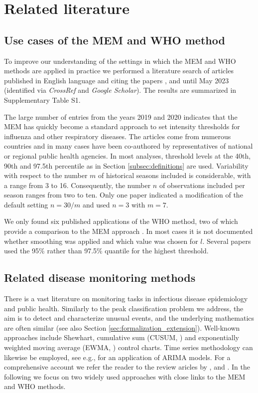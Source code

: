 \documentclass[12pt]{article}
\begin{document}
\section{Related literature}
\label{sec:review}

\subsection{Use cases of the MEM and WHO method}


To improve our understanding of the settings in which the MEM and WHO methods are applied in practice we performed a literature search of articles published in English language and citing the papers \cite{Vega2015}, \cite{WHO2014} and \cite{WHO2017} until May 2023 (identified via \textit{CrossRef} and \textit{Google Scholar}). The results are summarized in Supplementary Table S1.

The large number of entries from the years 2019 and 2020 indicates that the MEM has quickly become a standard approach to set intensity thresholds for influenza and other respiratory diseases. The articles come from numerous countries and in many cases have been co-authored by representatives of national or regional public health agencies. In most analyses, threshold levels at the 40th, 90th and 97.5th percentile as in Section \ref{subsec:definitions} are used. Variability with respect to the number $m$ of historical seasons included is considerable, with a range from 3 to 16. Consequently, the number $n$ of observations included per season ranges from two to ten. Only one paper \citep{Dahlgren2022} indicated a modification of the default setting $n = 30/m$  and used $n = 3$ with $m = 7$.

We only found six published applications of the WHO method, two of which provide a comparison to the MEM approach \citep{Rguig2020, Teeluck2021}. In most cases it is not documented whether smoothing was applied and which value was chosen for $l$. Several papers used the 95\% rather than 97.5\% quantile for the highest threshold.



\subsection{Related disease monitoring methods}
\label{sec:related_literature}


There is a vast literature on monitoring tasks in infectious disease epidemiology and public health. Similarly to the peak classification problem we address, the aim is to detect and characterize unusual events, and the underlying mathematics are often similar (see also Section \ref{sec:formalization_extension}). Well-known approaches include Shewhart, cumulative sum (CUSUM, \citealt{Hoehle2008}) and exponentially weighted moving average (EWMA, \citealt{Steiner2010}) control charts. Time series methodology can likewise be employed, see e.g., \cite{Reis2003} for an application of ARIMA models. For a comprehensive account we refer the reader to the review aricles by \cite{Allevius2020}, \cite{Rigdon2015} and \cite{Unkel2012}. In the following we focus on two widely used approaches with close links to the MEM and WHO methods.
\end{document}

